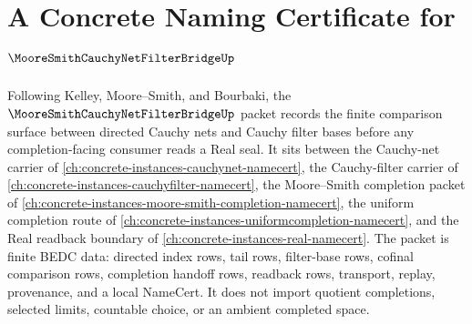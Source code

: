\chapter{A Concrete Naming Certificate for $\MooreSmithCauchyNetFilterBridgeUp$}
\label{ch:concrete-instances-moore-smith-cauchy-net-filter-bridge-namecert}

Following Kelley, Moore--Smith, and Bourbaki, the $\MooreSmithCauchyNetFilterBridgeUp$ packet records the finite comparison surface between directed Cauchy nets and Cauchy filter bases before any completion-facing consumer reads a Real seal. It sits between the Cauchy-net carrier of \autoref{ch:concrete-instances-cauchynet-namecert}, the Cauchy-filter carrier of \autoref{ch:concrete-instances-cauchyfilter-namecert}, the Moore--Smith completion packet of \autoref{ch:concrete-instances-moore-smith-completion-namecert}, the uniform completion route of \autoref{ch:concrete-instances-uniformcompletion-namecert}, and the Real readback boundary of \autoref{ch:concrete-instances-real-namecert}. The packet is finite BEDC data: directed index rows, tail rows, filter-base rows, cofinal comparison rows, completion handoff rows, readback rows, transport, replay, provenance, and a local NameCert. It does not import quotient completions, selected limits, countable choice, or an ambient completed space.


